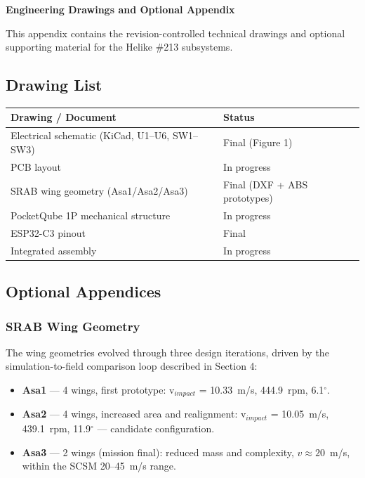 \textbf{\hfill\break
}

\textbf{Engineering Drawings and Optional Appendix}

This appendix contains the revision-controlled technical drawings and
optional supporting material for the Helike \#213 subsystems.

\subsection{Drawing List}

\begin{center}
{\small
\setlength{\tabcolsep}{6pt}
\begin{tabularx}{\linewidth}{>{\raggedright}p{6cm}X}
\toprule
\textbf{Drawing / Document} & \textbf{Status} \\
\midrule
Electrical schematic (KiCad, U1--U6, SW1--SW3) & Final (Figure 1) \\
PCB layout & In progress \\
SRAB wing geometry (Asa1/Asa2/Asa3) & Final (DXF + ABS prototypes) \\
PocketQube 1P mechanical structure & In progress \\
ESP32-C3 pinout & Final \\
Integrated assembly & In progress \\
\bottomrule
\end{tabularx}
}
\end{center}

\subsection{Optional Appendices}

\subsubsection{SRAB Wing Geometry}

The wing geometries evolved through three design iterations, driven
by the simulation-to-field comparison loop described in Section 4:

\begin{itemize}
\item \textbf{Asa1} — 4 wings, first prototype: v$_{impact}$ =
  10.33~m/s, 444.9~rpm, 6.1$^{\circ}$.
\item \textbf{Asa2} — 4 wings, increased area and realignment:
  v$_{impact}$ = 10.05~m/s, 439.1~rpm, 11.9$^{\circ}$ — candidate
  configuration.
\item \textbf{Asa3} — 2 wings (mission final): reduced mass and
  complexity, $v \approx 20$~m/s, within the SCSM 20--45~m/s range.
\end{itemize}

